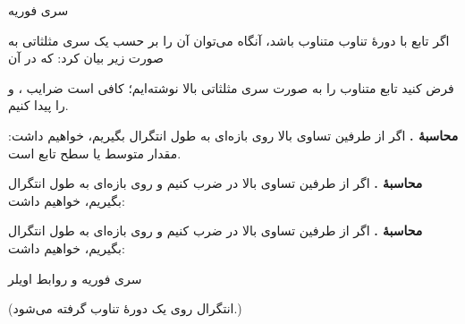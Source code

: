 \begin{EMtheorem}{سری فوریه}

اگر تابع  با دورهٔ تناوب \EMim{2\pi} متناوب باشد، آنگاه می‌توان آن را بر حسب یک سری مثلثاتی به صورت زیر بیان کرد:
که در آن

\end{EMtheorem}

\begin{EMproof}{}

فرض کنید تابع متناوب را به صورت سری مثلثاتی بالا نوشته‌ایم؛ کافی است ضرایب ،  و  را پیدا کنیم.

\textbf{محاسبهٔ .} اگر از طرفین تساوی بالا روی بازه‌ای به طول \EMim{2\pi} انتگرال بگیریم، خواهیم داشت:
 مقدار متوسط یا سطح  تابع است.

\textbf{محاسبهٔ .} اگر از طرفین تساوی بالا در  ضرب کنیم و روی بازه‌ای به طول \EMim{2\pi} انتگرال بگیریم، خواهیم داشت:

\textbf{محاسبهٔ .} اگر از طرفین تساوی بالا در  ضرب کنیم و روی بازه‌ای به طول \EMim{2\pi} انتگرال بگیریم، خواهیم داشت:

\end{EMproof}

\begin{EMimportant}{سری فوریه و روابط اویلر}

(انتگرال روی یک دورهٔ تناوب \EMim{2\pi} گرفته می‌شود.)

\end{EMimportant}

